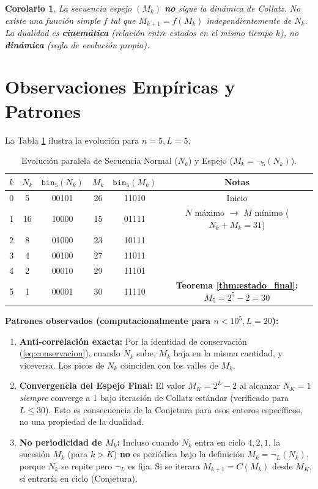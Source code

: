 \documentclass[11pt,a4paper]{article}
\newtheorem{corollary}[theorem]{Corolario}
\begin{document}
\begin{corollary}
La secuencia espejo $(M_k)$ \textbf{no} sigue la dinámica de Collatz. No existe una función simple $f$ tal que $M_{k+1} = f(M_k)$ independientemente de $N_k$. La dualidad es \textbf{cinemática} (relación entre estados en el mismo tiempo $k$), no \textbf{dinámica} (regla de evolución propia).
\end{corollary}

\section{Observaciones Empíricas y Patrones}
\label{sec:empirico}

La Tabla \ref{tab:ejemplo_n5} ilustra la evolución para $n=5, L=5$.

\begin{table}[h!]
\centering
\caption{Evolución paralela de Secuencia Normal ($N_k$) y Espejo ($M_k = \neg_5(N_k)$).}
\label{tab:ejemplo_n5}
\begin{tabular}{cccccc}
\toprule
$k$ & $N_k$ & $\mathtt{bin}_5(N_k)$ & $M_k$ & $\mathtt{bin}_5(M_k)$ & Notas \\
\midrule
0 & 5   & 00101 & 26 & 11010 & Inicio \\
1 & 16  & 10000 & 15 & 01111 & $N$ máximo $\to$ $M$ mínimo ($N_k+M_k=31$) \\
2 & 8   & 01000 & 23 & 10111 & \\
3 & 4   & 00100 & 27 & 11011 & \\
4 & 2   & 00010 & 29 & 11101 & \\
5 & 1   & 00001 & 30 & 11110 & \textbf{Teorema \ref{thm:estado_final}: $M_5=2^5-2=30$} \\
\bottomrule
\end{tabular}
\end{table}

\textbf{Patrones observados (computacionalmente para $n < 10^5, L=20$):}
\begin{enumerate}
    \item \textbf{Anti-correlación exacta:} Por la identidad de conservación (\ref{eq:conservacion}), cuando $N_k$ sube, $M_k$ baja en la misma cantidad, y viceversa. Los picos de $N_k$ coinciden con los valles de $M_k$.
    \item \textbf{Convergencia del Espejo Final:} El valor $M_K = 2^L-2$ al alcanzar $N_K=1$ \textit{siempre} converge a 1 bajo iteración de Collatz estándar (verificado para $L \le 30$). Esto es consecuencia de la Conjetura para esos enteros específicos, no una propiedad de la dualidad.
    \item \textbf{No periodicidad de $M_k$:} Incluso cuando $N_k$ entra en ciclo $4,2,1$, la sucesión $M_k$ (para $k>K$) \textbf{no} es periódica bajo la definición $M_k=\neg_L(N_k)$, porque $N_k$ se repite pero $\neg_L$ es fija. Si se iterara $M_{k+1} = C(M_k)$ desde $M_K$, sí entraría en ciclo (Conjetura).
\end{enumerate}
\end{document}
